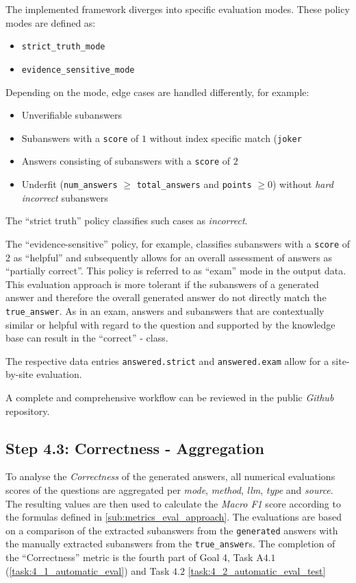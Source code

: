 The implemented framework diverges into specific evaluation modes.
These policy modes are defined as:
\begin{itemize}
    \item \texttt{strict\_truth\_mode}
    \item \texttt{evidence\_sensitive\_mode}
\end{itemize}
%
Depending on the mode, edge cases are handled differently, for example:
\begin{itemize}
    \item Unverifiable subanswers
    \item Subanswers with a \texttt{score} of $1$ without index specific match (\texttt{joker}
    \item Answers consisting of subanswers with a \texttt{score} of $2$
    \item Underfit (\texttt{num\_answers} $\geq$ \texttt{total\_answers} and \texttt{points} $\geq 0$) without \textit{hard incorrect} subanswers 
\end{itemize}

The \enquote{strict truth} policy classifies such cases as \textit{incorrect}.

The \enquote{evidence-sensitive} policy, for example, classifies subanswers with a \texttt{score} of \num{2} as \enquote{helpful} and subsequently allows for an overall assessment of answers as \enquote{partially correct}.
This policy is referred to as \enquote{exam} mode in the output data.
This evaluation approach is more tolerant if the subanswers of a generated answer and therefore the overall generated answer do not directly match the \texttt{true\_answer}.
As in an exam, answers and subanswers that are contextually similar or helpful with regard to the question and supported by the knowledge base can result in the \enquote{correct} - class.

The respective data entries \texttt{answered.strict} and \texttt{answered.exam} allow for a site-by-site evaluation.

A complete and comprehensive workflow can be reviewed in the public \textit{Github} repository.

\subsection[Step 4.3: Correctness]{Step 4.3: Correctness - Aggregation}\label{sub:Step4_3_correct}
To analyse the \textit{Correctness} of the generated answers, all numerical evaluations scores of the questions are aggregated per \textit{mode}, \textit{method}, \textit{llm}, \textit{type} and \textit{source}.
The resulting values are then used to calculate the \textit{Macro F1} score according to the formulas defined in \cref{sub:metrics_eval_approach}.
The evaluations are based on a comparison of the extracted subanswers from the \texttt{generated} answers with the manually extracted subanswers from the \texttt{true\_answer}s.
%
The completion of the \enquote{Correctness} metric is the fourth part of Goal 4, Task A$4.1$ (\cref{task:4_1_automatic_eval}) and Task $4.2$ \cref{task:4_2_automatic_eval_test}
